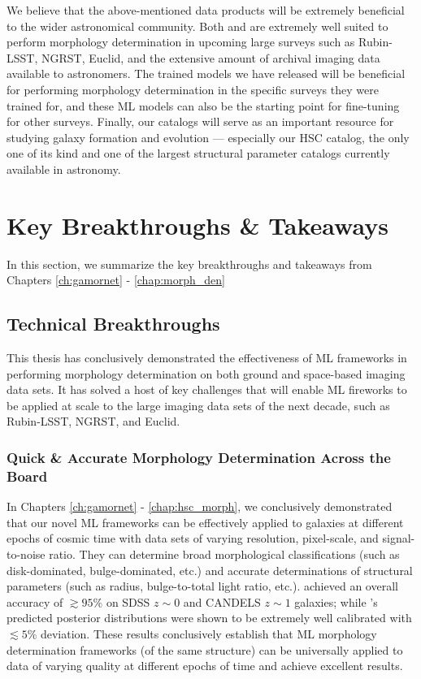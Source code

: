 We believe that the above-mentioned data products will be extremely beneficial to the wider astronomical community. Both \gamornet{} and \gampen{} are extremely well suited to perform morphology determination in upcoming large surveys such as Rubin-LSST, NGRST, Euclid, and the extensive amount of archival imaging data available to astronomers. The trained models we have released will be beneficial for performing morphology determination in the specific surveys they were trained for, and these ML models can also be the starting point for fine-tuning for other surveys. Finally, our catalogs will serve as an important resource for studying galaxy formation and evolution --- especially our HSC  catalog, the only one of its kind and one of the largest structural parameter catalogs currently available in astronomy. 

\section{Key Breakthroughs \& Takeaways} \label{sec_conc:takeaways}

In this section, we summarize the key breakthroughs and takeaways from Chapters \ref{ch:gamornet} - \ref{chap:morph_den}

\subsection{Technical Breakthroughs} \label{sec_conc:tech_breakthroughts}
This thesis has conclusively demonstrated the effectiveness of ML frameworks in performing morphology determination on both ground and space-based imaging data sets. It has solved a host of key challenges that will enable ML fireworks to be applied at scale to the large imaging data sets of the next decade, such as Rubin-LSST, NGRST, and Euclid. 

\subsubsection{Quick \& Accurate Morphology Determination Across the Board } 
In Chapters \ref{ch:gamornet} - \ref{chap:hsc_morph}, we conclusively demonstrated that our novel ML frameworks can be effectively applied to galaxies at different epochs of cosmic time with data sets of varying resolution, pixel-scale, and signal-to-noise ratio. They can determine broad morphological classifications (such as disk-dominated, bulge-dominated, etc.) and accurate determinations of structural parameters (such as radius, bulge-to-total light ratio, etc.). \gamornet{} achieved an overall accuracy  of $\gtrsim 95\%$ on SDSS $z\sim0$ and CANDELS $z\sim1$ galaxies; while \gampen{}'s predicted posterior distributions were shown to be extremely well calibrated with $\lesssim 5\%$ deviation. These results conclusively establish that ML morphology determination frameworks (of the same structure) can be universally applied to data of varying quality at different epochs of time and achieve excellent results.

